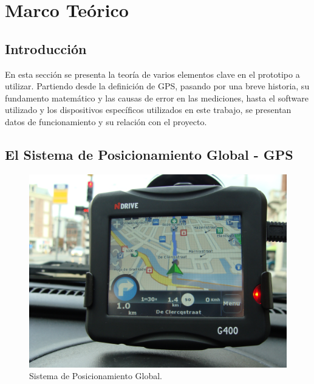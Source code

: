 
\chapter{Marco Teórico} %

\label{Chap:Marco} %




\section{Introducción}

En esta sección se presenta la teoría de varios elementos clave en el prototipo a utilizar. Partiendo desde la definición de GPS, pasando por una breve historia, su fundamento matemático y las causas de error en las mediciones, hasta el software utilizado y los dispositivos específicos utilizados en este trabajo, se presentan datos de funcionamiento y su relación con el proyecto.

\section{El Sistema de Posicionamiento Global - GPS}

\begin{figure}[ht]
\centering
\includegraphics[scale=0.12]{Figures/GPS}
\caption[Sistema de Posicionamiento Global.]{Sistema de Posicionamiento Global.\footnotemark}
\label{fig:GPS}
\end{figure}


